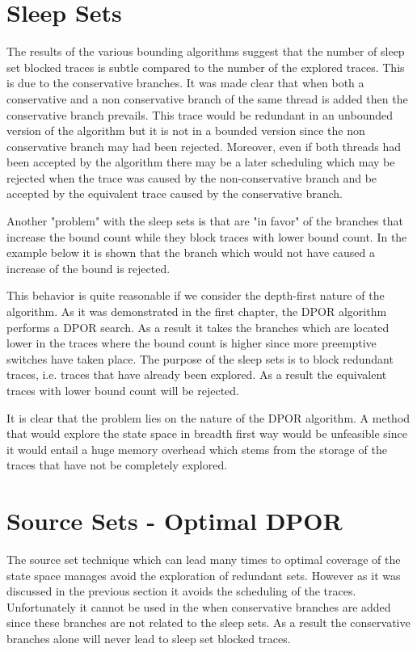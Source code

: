 \section{Sleep Sets}
The results of the various bounding algorithms suggest that the number of sleep set blocked traces is subtle compared to the number of the explored traces. This is due to the conservative
branches. It was made clear that when both a conservative and a non conservative branch of the same thread is added then the conservative branch prevails. This trace would be 
redundant in an unbounded version of the algorithm but it is not in a bounded version since the non conservative branch may had been rejected. Moreover, even if both threads had been accepted 
by the algorithm there may be a later scheduling which may be rejected when the trace was caused by the non-conservative branch and be accepted by the equivalent trace caused by the conservative
branch. 

Another "problem" with the sleep sets is that are "in favor" of the branches that increase the bound count while they block traces with lower bound count.
In the example below it is shown that the branch which would not have caused a increase of the bound is rejected.


This behavior is quite reasonable if we consider the depth-first nature of the algorithm. As it was demonstrated in the first chapter, the DPOR algorithm performs a DPOR search. As a result
it takes the branches which are located lower in the traces where the bound count is higher since more preemptive switches have taken place. The purpose of the sleep sets is to block redundant traces, i.e. traces that have already been
explored. As a result the equivalent traces with lower bound count will be rejected.

It is clear that the problem lies on the nature of the DPOR algorithm. A method that would explore the state space in breadth first way would be unfeasible since it would
entail a huge memory overhead which stems from the storage of the traces that have not be completely explored. 

\section{Source Sets - Optimal DPOR}
The source set technique which can lead many times to optimal coverage of the state space manages avoid the exploration of redundant sets. However as it was discussed
in the previous section it avoids the scheduling of the traces. Unfortunately it cannot be used in the when conservative branches are added since these branches are not
related to the sleep sets. As a result the conservative branches alone will never lead to sleep set blocked traces.

